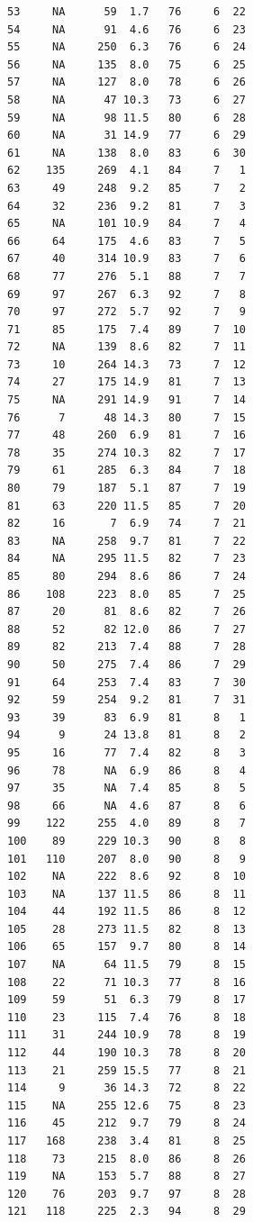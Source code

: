 \documentclass[
  letterpaper,
  DIV=11,
  numbers=noendperiod]{scrreprt}
\begin{document}
\begin{verbatim}
53     NA      59  1.7   76     6  22
54     NA      91  4.6   76     6  23
55     NA     250  6.3   76     6  24
56     NA     135  8.0   75     6  25
57     NA     127  8.0   78     6  26
58     NA      47 10.3   73     6  27
59     NA      98 11.5   80     6  28
60     NA      31 14.9   77     6  29
61     NA     138  8.0   83     6  30
62    135     269  4.1   84     7   1
63     49     248  9.2   85     7   2
64     32     236  9.2   81     7   3
65     NA     101 10.9   84     7   4
66     64     175  4.6   83     7   5
67     40     314 10.9   83     7   6
68     77     276  5.1   88     7   7
69     97     267  6.3   92     7   8
70     97     272  5.7   92     7   9
71     85     175  7.4   89     7  10
72     NA     139  8.6   82     7  11
73     10     264 14.3   73     7  12
74     27     175 14.9   81     7  13
75     NA     291 14.9   91     7  14
76      7      48 14.3   80     7  15
77     48     260  6.9   81     7  16
78     35     274 10.3   82     7  17
79     61     285  6.3   84     7  18
80     79     187  5.1   87     7  19
81     63     220 11.5   85     7  20
82     16       7  6.9   74     7  21
83     NA     258  9.7   81     7  22
84     NA     295 11.5   82     7  23
85     80     294  8.6   86     7  24
86    108     223  8.0   85     7  25
87     20      81  8.6   82     7  26
88     52      82 12.0   86     7  27
89     82     213  7.4   88     7  28
90     50     275  7.4   86     7  29
91     64     253  7.4   83     7  30
92     59     254  9.2   81     7  31
93     39      83  6.9   81     8   1
94      9      24 13.8   81     8   2
95     16      77  7.4   82     8   3
96     78      NA  6.9   86     8   4
97     35      NA  7.4   85     8   5
98     66      NA  4.6   87     8   6
99    122     255  4.0   89     8   7
100    89     229 10.3   90     8   8
101   110     207  8.0   90     8   9
102    NA     222  8.6   92     8  10
103    NA     137 11.5   86     8  11
104    44     192 11.5   86     8  12
105    28     273 11.5   82     8  13
106    65     157  9.7   80     8  14
107    NA      64 11.5   79     8  15
108    22      71 10.3   77     8  16
109    59      51  6.3   79     8  17
110    23     115  7.4   76     8  18
111    31     244 10.9   78     8  19
112    44     190 10.3   78     8  20
113    21     259 15.5   77     8  21
114     9      36 14.3   72     8  22
115    NA     255 12.6   75     8  23
116    45     212  9.7   79     8  24
117   168     238  3.4   81     8  25
118    73     215  8.0   86     8  26
119    NA     153  5.7   88     8  27
120    76     203  9.7   97     8  28
121   118     225  2.3   94     8  29

\end{verbatim}
\end{document}
